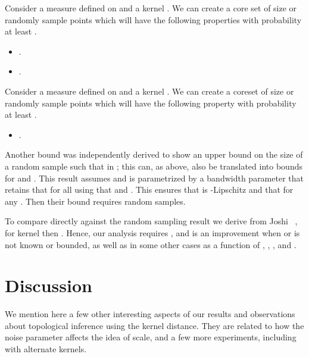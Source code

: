 \documentclass[11pt]{myclass}
\begin{document}
\begin{corollary}
Consider a measure  defined on  and a kernel .  
We can create a core set  of size  or randomly sample  points which will have the following properties with probability at least .  
\begin{itemize}
\item .
\item .
\end{itemize}
\end{corollary}


\begin{corollary}
Consider a measure  defined on  and a kernel .  
We can create a coreset  of size  or randomly sample  points which will have the following property with probability at least .  
\begin{itemize}
\item .
\end{itemize}
\end{corollary}



Another bound was independently derived to show an upper bound on the size of a random sample  such that  in \cite{BFLRSW13};  this can, as above, also be translated into bounds for  and .  This result assumes  and is parametrized by a bandwidth parameter  that retains that  for all  using that  and .  This ensures that  is -Lipschitz and that  for any .  Then their bound requires
 random samples.  

To compare directly against the random sampling result we derive from Joshi \etal~\cite{JoshiKommarajuPhillips2011}, for kernel  then .  Hence, our analysis requires , and is an improvement when  or  is not known or bounded, as well as in some other cases as a function of , , , and .   





\section{Discussion}
\label{app:discuss}
We mention here a few other interesting aspects of our results and observations about topological inference using the kernel distance.  They are related to how the noise parameter  affects the idea of scale, and a few more experiments, including with alternate kernels.  
\end{document}
